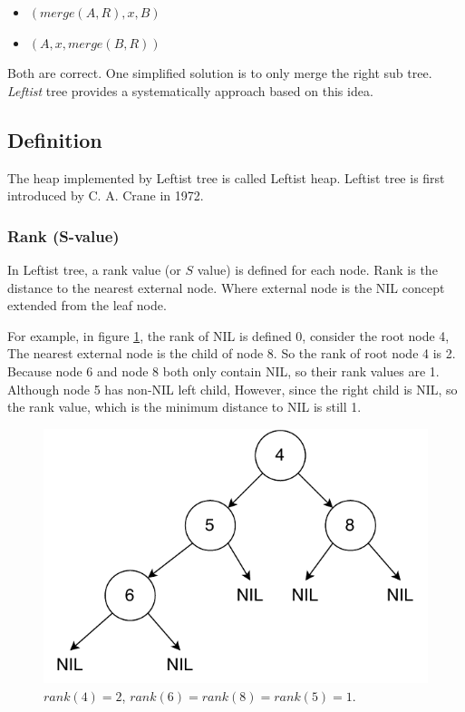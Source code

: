 \documentclass[b5paper]{article}
\begin{document}
\begin{itemize}
\item $(merge(A, R), x, B)$
\item $(A, x, merge(B, R))$
\end{itemize}

Both are correct. One simplified solution is to only merge the right
sub tree. {\em Leftist} tree provides a systematically approach based on this
idea.

\subsection{Definition}

The heap implemented by Leftist tree is called Leftist heap. Leftist
tree is first introduced by C. A. Crane in 1972\cite{wiki-leftist-tree}.

\subsubsection{Rank (S-value)}

In Leftist tree, a rank value (or $S$ value) is defined for each node.
Rank is the distance to the nearest external node. Where external node
is the NIL concept extended from the leaf node.

For example, in figure \ref{fig:rank}, the rank of NIL
is defined 0, consider the root node 4, The nearest external node is
the child of node 8. So the rank of root node 4 is 2. Because node
6 and node 8 both only contain NIL, so their rank values are 1.
Although node 5 has non-NIL left child, However, since the right
child is NIL, so the rank value, which is the minimum distance
to NIL is still 1.

\begin{figure}[htbp]
   \begin{center}
     \includegraphics[scale=0.5]{img/rank}
     \caption{$rank(4) = 2$, $rank(6) = rank(8) = rank(5) = 1$.} \label{fig:rank}
   \end{center}
\end{figure}
\end{document}
